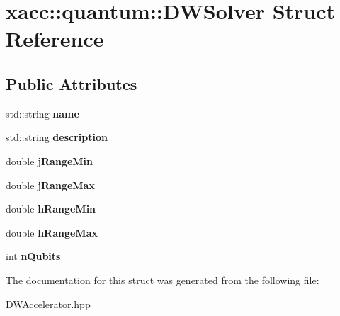 \hypertarget{a01129}{}\section{xacc\+:\+:quantum\+:\+:D\+W\+Solver Struct Reference}
\label{a01129}
\subsection*{Public Attributes}
\begin{DoxyCompactItemize}
\item 
\mbox{\label{a01129_a8a5b629dc83790a855d429c82266b772}} 
std\+::string {\bfseries name}
\item 
\mbox{\label{a01129_a9bb9449a6ea09e11892f910a4bfd2e08}} 
std\+::string {\bfseries description}
\item 
\mbox{\label{a01129_a45fc23af53f44759afec0257d9878ba0}} 
double {\bfseries j\+Range\+Min}
\item 
\mbox{\label{a01129_aa881af1344ff55a4991c152f768ed9d6}} 
double {\bfseries j\+Range\+Max}
\item 
\mbox{\label{a01129_abf475612dac8f64a7f88cfa976c393f0}} 
double {\bfseries h\+Range\+Min}
\item 
\mbox{\label{a01129_a13dd875ceb06c7545fe20cde15ffac70}} 
double {\bfseries h\+Range\+Max}
\item 
\mbox{\label{a01129_a2908c913f5c5e3ade6551056aaadafbf}} 
int {\bfseries n\+Qubits}
\end{DoxyCompactItemize}


The documentation for this struct was generated from the following file\+:\begin{DoxyCompactItemize}
\item 
D\+W\+Accelerator.\+hpp\end{DoxyCompactItemize}
